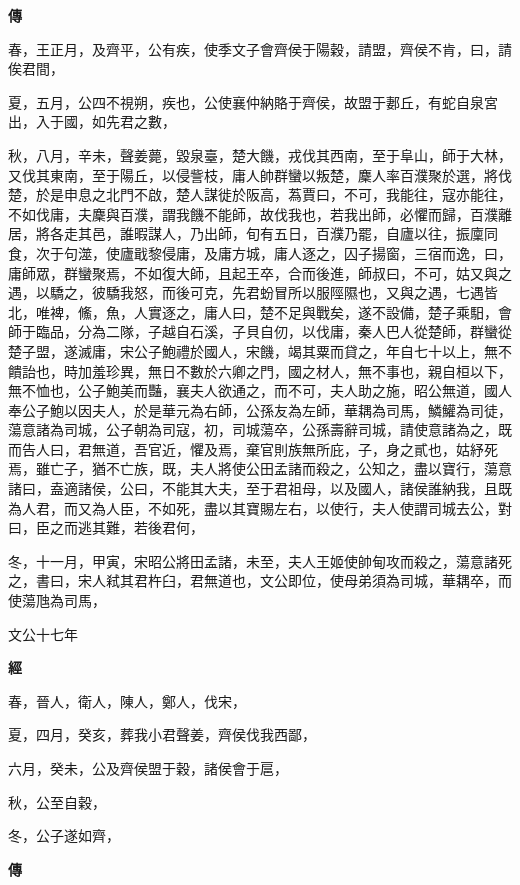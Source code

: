 \documentclass{ctexart}
\begin{document}
\textbf{傳}



春，王正月，及齊平，公有疾，使季文子會齊侯于陽穀，請盟，齊侯不肯，曰，請俟君間，

夏，五月，公四不視朔，疾也，公使襄仲納賂于齊侯，故盟于郪丘，有蛇自泉宮出，入于國，如先君之數，

秋，八月，辛未，聲姜薨，毀泉臺，楚大饑，戎伐其西南，至于阜山，師于大林，又伐其東南，至于陽丘，以侵訾枝，庸人帥群蠻以叛楚，麇人率百濮聚於選，將伐楚，於是申息之北門不啟，楚人謀徙於阪高，蒍賈曰，不可，我能往，寇亦能往，不如伐庸，夫麇與百濮，謂我饑不能師，故伐我也，若我出師，必懼而歸，百濮離居，將各走其邑，誰暇謀人，乃出師，旬有五日，百濮乃罷，自廬以往，振廩同食，次于句澨，使廬戢黎侵庸，及庸方城，庸人逐之，囚子揚窗，三宿而逸，曰，庸師眾，群蠻聚焉，不如復大師，且起王卒，合而後進，師叔曰，不可，姑又與之遇，以驕之，彼驕我怒，而後可克，先君蚡冒所以服陘隰也，又與之遇，七遇皆北，唯裨，鯈，魚，人實逐之，庸人曰，楚不足與戰矣，遂不設備，楚子乘馹，會師于臨品，分為二隊，子越自石溪，子貝自仞，以伐庸，秦人巴人從楚師，群蠻從楚子盟，遂滅庸，宋公子鮑禮於國人，宋饑，竭其粟而貸之，年自七十以上，無不饋詒也，時加羞珍異，無日不數於六卿之門，國之材人，無不事也，親自桓以下，無不恤也，公子鮑美而豔，襄夫人欲通之，而不可，夫人助之施，昭公無道，國人奉公子鮑以因夫人，於是華元為右師，公孫友為左師，華耦為司馬，鱗鱹為司徒，蕩意諸為司城，公子朝為司寇，初，司城蕩卒，公孫壽辭司城，請使意諸為之，既而告人曰，君無道，吾官近，懼及焉，棄官則族無所庇，子，身之貳也，姑紓死焉，雖亡子，猶不亡族，既，夫人將使公田孟諸而殺之，公知之，盡以寶行，蕩意諸曰，盍適諸侯，公曰，不能其大夫，至于君祖母，以及國人，諸侯誰納我，且既為人君，而又為人臣，不如死，盡以其寶賜左右，以使行，夫人使謂司城去公，對曰，臣之而逃其難，若後君何，

冬，十一月，甲寅，宋昭公將田孟諸，未至，夫人王姬使帥甸攻而殺之，蕩意諸死之，書曰，宋人弒其君杵臼，君無道也，文公即位，使母弟須為司城，華耦卒，而使蕩虺為司馬，





文公十七年


\textbf{經}



春，晉人，衛人，陳人，鄭人，伐宋，

夏，四月，癸亥，葬我小君聲姜，齊侯伐我西鄙，

六月，癸未，公及齊侯盟于穀，諸侯會于扈，

秋，公至自穀，

冬，公子遂如齊，

\textbf{傳}
\end{document}
